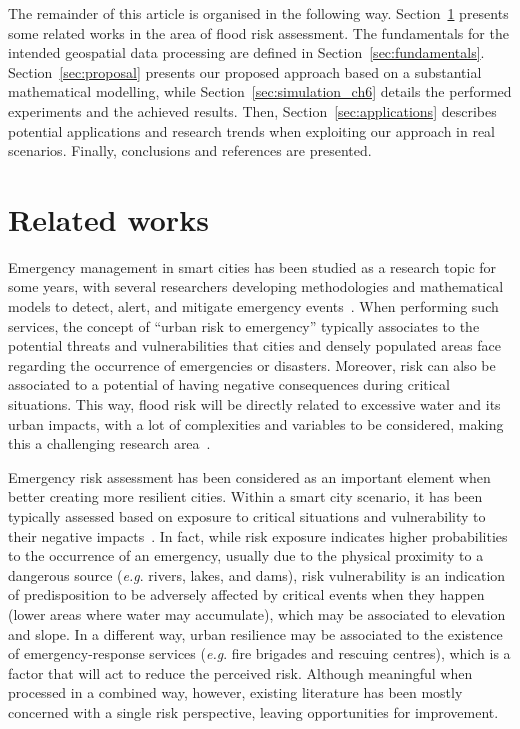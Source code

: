 \begin{refsection}
The remainder of this article is organised in the following way. Section~\ref{sec:related_works} presents some related works in the area of flood risk assessment. The fundamentals for the intended geospatial data processing are defined in Section~\ref{sec:fundamentals}. Section~\ref{sec:proposal} presents our proposed approach based on a substantial mathematical modelling, while Section~\ref{sec:simulation_ch6} details the performed experiments and the achieved results. Then, Section~\ref{sec:applications} describes potential applications and research trends when exploiting our approach in real scenarios. Finally, conclusions and references are presented.

\section{Related works}\label{sec:related_works}

Emergency management in smart cities has been studied as a research topic for some years, with several researchers developing methodologies and mathematical models to detect, alert, and mitigate emergency events~\cite{survey,survey2}. When performing such services, the concept of ``urban risk to emergency'' typically associates to the potential threats and vulnerabilities that cities and densely populated areas face regarding the occurrence of emergencies or disasters. Moreover, risk can also be associated to a potential of having negative consequences during critical situations. This way, flood risk will be directly related to excessive water and its urban impacts, with a lot of complexities and variables to be considered, making this a challenging research area~\cite{floodrisk,floodrisk2}.

Emergency risk assessment has been considered as an important element when better creating more resilient cities. Within a smart city scenario, it has been typically assessed based on exposure to critical situations and vulnerability to their negative impacts~\cite{risks1}. In fact, while risk exposure indicates higher probabilities to the occurrence of an emergency, usually due to the physical proximity to a dangerous source (\textit{e.g}. rivers, lakes, and dams), risk vulnerability is an indication of predisposition to be adversely affected by critical events when they happen (lower areas where water may accumulate), which may be associated to elevation and slope. In a different way, urban resilience may be associated to the existence of emergency-response services (\textit{e.g}. fire brigades and rescuing centres), which is a factor that will act to reduce the perceived risk. Although meaningful when processed in a combined way, however, existing literature has been mostly concerned with a single risk perspective, leaving opportunities for improvement.


\end{refsection}
